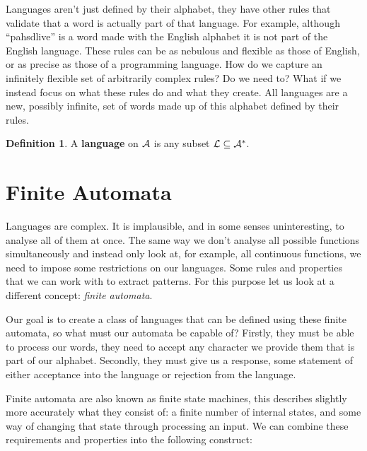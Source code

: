\documentclass[a4paper]{article}
\theoremstyle{definition}
\newtheorem{definition}{Definition}[section]
\theoremstyle{definition}
\theoremstyle{definition}
\begin{document}
Languages aren't just defined by their alphabet, they have other rules that validate that a word is actually part of that language. For example, although ``pahsdlive'' is a word made with the English alphabet it is not part of the English language. These rules can be as nebulous and flexible as those of English, or as precise as those of a programming language. How do we capture an infinitely flexible set of arbitrarily complex rules? Do we need to? What if we instead focus on what these rules do and what they create. All languages are a new, possibly infinite, set of words made up of this alphabet defined by their rules.

\newcommand{\aLanguage}{\mathcal{L}}
\begin{definition}
    \label{def:language}
    A \textbf{language} on \(\mathcal{A}\) is any subset \(\aLanguage \subseteq \alphabet^*\).
\end{definition}

\section{Finite Automata}

Languages are complex. It is implausible, and in some senses uninteresting, to analyse all of them at once. The same way we don't analyse all possible functions simultaneously and instead only look at, for example, all continuous functions, we need to impose some restrictions on our languages. Some rules and properties that we can work with to extract patterns. For this purpose let us look at a different concept: \emph{finite automata}.

Our goal is to create a class of languages that can be defined using these finite automata, so what must our automata be capable of? Firstly, they must be able to process our words, they need to accept any character we provide them that is part of our alphabet. Secondly, they must give us a response, some statement of either acceptance into the language or rejection from the language.

Finite automata are also known as finite state machines, this describes slightly more accurately what they consist of: a finite number of internal states, and some way of changing that state through processing an input. We can combine these requirements and properties into the following construct:
\end{document}
